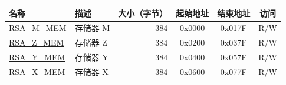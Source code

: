 \label{regdesc:RSAmemory}
\begin{longtable}{ | p{3cm} | p{3cm} | r | c | c | c | }

\hline
\rowcolor{lightgray}
名称 & 描述 &  大小（字节） & 起始地址 & 结束地址 & 访问 \\ \hline
\hyperref[regdesc:RSAmemory]{RSA\_M\_MEM} & 存储器 M  & 384   & 0x0000 & 0x017F & R/W \\ \hline
\hyperref[regdesc:RSAmemory]{RSA\_Z\_MEM} & 存储器 Z  & 384  & 0x0200 & 0x037F & R/W \\ \hline
\hyperref[regdesc:RSAmemory]{RSA\_Y\_MEM} & 存储器 Y  & 384  & 0x0400 & 0x057F & R/W \\ \hline
\hyperref[regdesc:RSAmemory]{RSA\_X\_MEM} & 存储器 X  & 384  & 0x0600 & 0x077F & R/W \\ \hline

\end{longtable}

